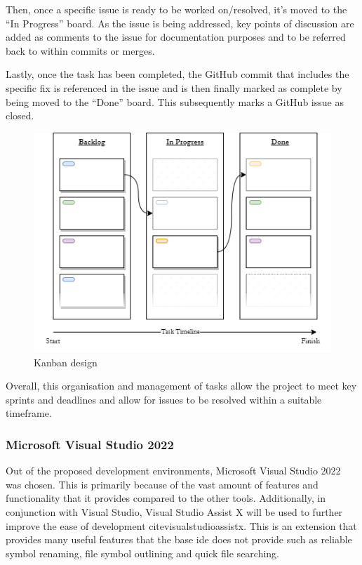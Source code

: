 \documentclass[11pt]{article}
\begin{document}
Then, once a specific issue is ready to be worked on/resolved, it's moved to the
``In Progress'' board. As the issue is being addressed, key points of discussion
are added as comments to the issue for documentation purposes and to be referred
back to within commits or merges.

Lastly, once the task has been completed, the GitHub commit that includes the
specific fix is referenced in the issue and is then finally marked as complete
by being moved to the ``Done'' board. This subsequently marks a GitHub issue as
closed.
\begin{figure}[H]
  \centering
  \includegraphics[width=\textwidth]{images/kanban_design.png}
  \caption{Kanban design}
  \label{fig:kanban_design}
\end{figure}

Overall, this organisation and management of tasks allow the project to meet key
sprints and deadlines and allow for issues to be resolved within a suitable
timeframe.

\subsubsection{Microsoft Visual Studio 2022} \label{development_environment}
Out of the proposed development environments, Microsoft Visual Studio 2022 was
chosen. This is primarily because of the vast amount of features and
functionality that it provides compared to the other tools. Additionally, in
conjunction with Visual Studio, Visual Studio Assist X will be used to further
improve the ease of development cite{visualstudioassistx}. This is an extension
that provides many useful features that the base \gls*{ide} does not provide
such as reliable symbol renaming, file symbol outlining and quick file
searching.
\end{document}
